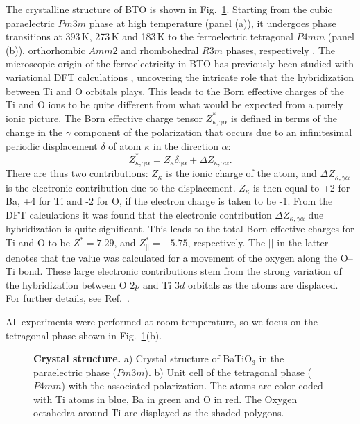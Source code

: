 The crystalline structure of BTO is shown in Fig.~\ref{fig:BTO_crystal}.
Starting from the cubic paraelectric $Pm3m$ phase at high temperature (panel (a)), it undergoes phase transitions at 393\,K, 273\,K and 183\,K to the ferroelectric tetragonal $P4mm$ (panel (b)), orthorhombic $Amm2$ and rhombohedral $R3m$ phases, respectively \cite{Mason1948, VonHippel1950, Marton2010}.
The microscopic origin of the ferroelectricity in BTO has previously been studied with variational DFT calculations \cite{Ghosez1995}, uncovering the intricate role that the hybridization between Ti and O orbitals plays.
This leads to the Born effective charges of the Ti and O ions to be quite different from what would be expected from a purely ionic picture.
The Born effective charge tensor $Z^*_{\kappa, \gamma\alpha}$ is defined in terms of the change in the $\gamma$ component of the polarization that occurs due to an infinitesimal periodic displacement $\delta$ of atom $\kappa$ in the direction $\alpha$:
\begin{equation}
Z^*_{\kappa, \gamma\alpha} = Z_{\kappa} \delta_{\gamma\alpha} + \Delta Z_{\kappa, \gamma\alpha}.
\end{equation}
There are thus two contributions: $Z_{\kappa}$ is the ionic charge of the atom, and $\Delta Z_{\kappa, \gamma\alpha}$ is the electronic contribution due to the displacement.
$Z_{\kappa}$ is then equal to +2 for Ba, +4 for Ti and -2 for O, if the electron charge is taken to be -1.
From the DFT calculations it was found that the electronic contribution $\Delta Z_{\kappa, \gamma\alpha}$ due hybridization is quite significant.
This leads to the total Born effective charges for Ti and O to be $Z^* = 7.29$, and $Z^*_{||} = -5.75$, respectively.
The $||$ in the latter denotes that the value was calculated for a movement of the oxygen along the O--Ti bond.
These large electronic contributions stem from the strong variation of the hybridization between O $2p$ and Ti $3d$ orbitals as the atoms are displaced.
For further details, see Ref.~\cite{Ghosez1995}.

All experiments were performed at room temperature, so we focus on the tetragonal phase shown in Fig.~\ref{fig:BTO_crystal}(b).
\begin{figure}[h]
	\caption{\label{fig:BTO_crystal}{\bf Crystal structure.} a) Crystal structure of BaTiO$_3$ in the paraelectric phase ($Pm3m$). b) Unit cell of the tetragonal phase ($P4mm$) with the associated polarization. The atoms are color coded with Ti atoms in blue, Ba in green and O in red. The Oxygen octahedra around Ti are displayed as the shaded polygons.}
\end{figure}

